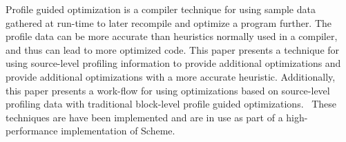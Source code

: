 Profile guided optimization is a compiler technique for using sample data
gathered at run-time to later recompile and optimize a program further.  The
profile data can be more accurate than heuristics normally used in a compiler,
and thus can lead to more optimized code. This paper presents a technique for
using source-level profiling information to provide additional optimizations
and provide additional optimizations with a more accurate heuristic.
Additionally, this paper presents a work-flow for using optimizations based on
source-level profiling data with traditional block-level profile guided
optimizations.~ These techniques are have been implemented and are
in use as part of a high-performance implementation of Scheme.

